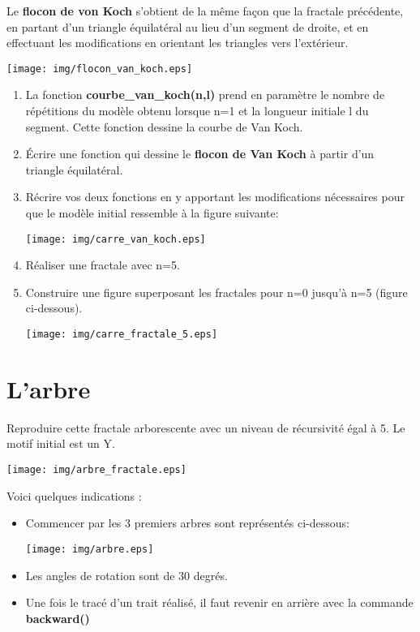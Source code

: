 \documentclass[11pt,a4paper]{article}
\begin{document}
\begin{minipage}{12cm}
Le \textbf{flocon de von Koch} s'obtient de la même façon que
la fractale précédente, en partant d'un triangle équilatéral
au lieu d'un segment de droite, et en effectuant les
modifications en orientant les triangles vers l'extérieur.
\end{minipage}\hfill
\begin{minipage}{6cm}
\begin{center}
\texttt{[image: img/flocon\_van\_koch.eps]}
\end{center}
\end{minipage}
\begin{enumerate}
\item La fonction \textbf{courbe\_van\_koch(n,l)} prend en paramètre le nombre de répétitions du modèle obtenu lorsque n=1 et la longueur initiale l du segment. Cette fonction dessine la courbe de Van Koch.
\item Écrire une fonction qui dessine le \textbf{flocon de Van Koch} à partir d'un triangle équilatéral.
\item Récrire vos deux fonctions en y apportant les modifications nécessaires pour que le modèle initial ressemble à la figure suivante:
\begin{center}
\texttt{[image: img/carre\_van\_koch.eps]}
\end{center}
\item Réaliser une fractale avec n=5.
\item Construire une figure superposant les fractales pour n=0 jusqu'à n=5 (figure ci-dessous).
\begin{center}
\texttt{[image: img/carre\_fractale\_5.eps]}
\end{center}
\end{enumerate}

\section{L'arbre}

Reproduire cette fractale arborescente avec un niveau de récursivité égal à 5. Le motif initial est un Y.
\begin{center}
\texttt{[image: img/arbre\_fractale.eps]}
\end{center}
Voici quelques indications :
\begin{itemize}
\item Commencer par les 3 premiers arbres sont représentés ci-dessous:
\begin{center}
\texttt{[image: img/arbre.eps]}
\end{center}
\item Les angles de rotation sont de 30 degrés.
\item Une fois le tracé d'un trait réalisé, il faut revenir en arrière avec la commande \textbf{backward()}
\end{itemize}
\end{document}

